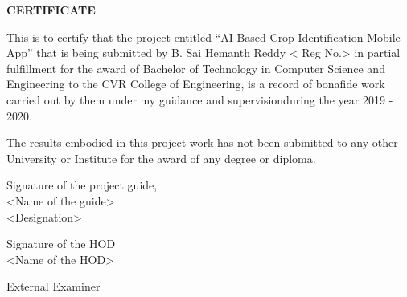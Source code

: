 \documentclass[../Report.tex]{subfiles}
\begin{document}
    \begin{center}
        \textbf{CERTIFICATE}
    \end{center}

    \setlength{\leftskip}{1.2cm}
    This is to certify that the project entitled “AI Based Crop Identification Mobile App” 
    that is being submitted by B. Sai Hemanth Reddy < Reg No.> in partial fulfillment for 
    the award of Bachelor of Technology in Computer Science and  Engineering to the 
    CVR College of Engineering, is a record of bonafide work carried out by them under my 
    guidance and supervisionduring the year 2019 - 2020.

    \vspace{\baselineskip}

    \setlength{\leftskip}{1.2cm}
    The results embodied in this project work has not been submitted to any other University 
    or Institute for the award of any degree or diploma.

    \vspace{\baselineskip}\vspace{\baselineskip}

    \setlength{\leftskip}{0pt}
    \begin{minipage}[t]{.5\textwidth}
        \raggedright
        Signature of the project guide, \\
        <Name of the guide> \\
        <Designation>
    \end{minipage}%
    \begin{minipage}[t]{.5\textwidth}
        \raggedleft
        Signature of the HOD \\
        <Name of the HOD>
    \end{minipage}
    
    \vspace{\baselineskip}\vspace{\baselineskip}\vspace{\baselineskip}

    \begin{center}
        External Examiner
    \end{center}

    \pagebreak
\end{document}
